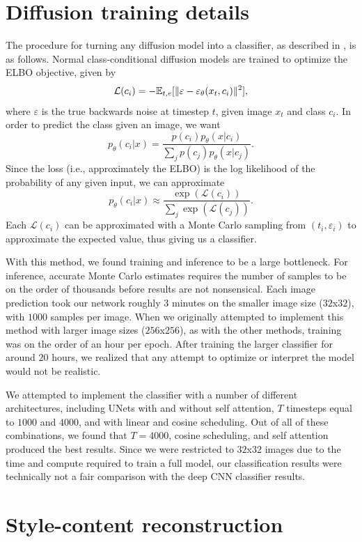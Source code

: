 \documentclass[twocolumn]{article}
\begin{document}
\section{Diffusion training details}\label{sec:diffusionAppendix}

The procedure for turning any diffusion model into a classifier, as described in \cite{liYourDiffusionModel}, is as follows. Normal class-conditional diffusion models are trained to optimize the ELBO objective, given by 
\[\mathcal{L}(c_i) = -\mathbb{E}_{t,e}[\lVert\varepsilon - \varepsilon_{\theta}(x_t,c_i)\rVert^2],\]
where $\varepsilon$ is the true backwards noise at timestep $t$, given image $x_t$ and class $c_i$. In order to predict the class given an image, we want 
\[p_{\theta}(c_i|x) = \frac{p(c_i)p_{\theta}(x|c_i)}{\sum_j p(c_j)p_{\theta}(x|c_j)}.\]
Since the loss (i.e., approximately the ELBO) is the log likelihood of the probability of any given input, we can approximate 
\[p_{\theta}(c_i|x) \approx \frac{\exp\left(\mathcal{L}(c_i)\right)}{\sum_j \exp\left(\mathcal{L}(c_j)\right)}.\]
Each $\mathcal{L}(c_i)$ can be approximated with a Monte Carlo sampling from $(t_i, \varepsilon_i)$ to approximate the expected value, thus giving us a classifier.

With this method, we found training and inference to be a large bottleneck. For inference, accurate Monte Carlo estimates requires the number of samples to be on the order of thousands before results are not nonsensical. Each image prediction took our network roughly $3$ minutes on the smaller image size ($32$x$32$), with $1000$ samples per image. When we originally attempted to implement this method with larger image sizes ($256$x$256$), as with the other methods, training was on the order of an hour per epoch. After training the larger classifier for around $20$ hours, we realized that any attempt to optimize or interpret the model would not be realistic. 

We attempted to implement the classifier with a number of different architectures, including UNets with and without self attention, $T$ timesteps equal to $1000$ and $4000$, and with linear and cosine scheduling. Out of all of these combinations, we found that $T=4000$, cosine scheduling, and self attention produced the best results. Since we were restricted to $32$x$32$ images due to the time and compute required to train a full model, our classification results were technically not a fair comparison with the deep CNN classifier results. 

\section{Style-content reconstruction}\label{sec:stylecontentreconstruction}
\end{document}
